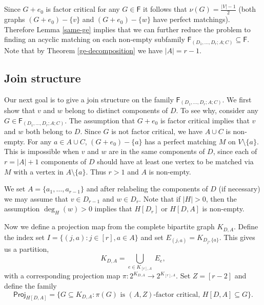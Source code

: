 \documentclass[10pt]{amsart}
\theoremstyle{definition}
\begin{document}
	Since $G+e_0$ is factor critical for any  $G\in \mathsf{F}$ it follows that $\nu(G) = \frac{|V|-1}{2}$ (both graphs $(G+e_0)-\{v\}$ and $(G+e_0)-\{w\}$ have perfect matchings).
	Therefore Lemma \ref{same-ge} implies that we can further reduce the problem to finding an acyclic matching on each non-empty subfamily $\mathsf{F}_{(D_1, \dots, D_r; A; C)} \subseteq \mathsf{F}$. Note that by Theorem \ref{ge-decomposition} we have $|A| = r-1$.
	
	
	
	
	
	\subsection*{Join structure} Our next goal is to give a join structure on the family $\mathsf{F}_{(D_1, \dots, D_r; A; C)}$. We first show that $v$ and $w$ belong to distinct components of $D$. To see why, consider any  $G\in \mathsf{F}_{(D_1, \dots, D_r; A; C)}$. The assumption that $G+e_0$ is factor critical implies that $v$ and $w$ both belong to $D$. Since $G$ is not factor critical, we have $A\cup C$ is non-empty. For any $a\in A\cup C$, $(G+e_0)-\{a\}$ has a perfect matching $M$ on $V\setminus \{a\}$. This is impossible when $v$ and $w$ are in the same components of $D$, since each of $r=|A|+1$ components of $D$ should have at least one vertex to be matched via $M$ with a vertex in $A\setminus \{a\}$. Thus $r>1$ and $A$ is non-empty.
	
	
	We set $A = \{a_1, \dots, a_{r-1}\}$ and after relabeling the components of $D$ (if necessary) we may assume that $v\in D_{r-1}$ and $w\in D_r$. Note that if $|H|>0$, then the assumption $\deg_H(w)>0$ implies that $H[D_r]$ or $H[D,A]$ is non-empty. 
	
	\medskip
	
	Now we define a projection map from the complete bipartite graph $K_{D,A}$. Define the index set 
	$I = \{(j,a) : j\in [r], a\in A\}$ and set $E_{(j,a)} = K_{D_j, \{a\}}$.
	This gives us a partition,
	\[K_{D,A} = \textstyle{\bigcup}_{e \in K_{[r],A}} \: E_e,\]
	with a corresponding projection map $\pi : 2^{K_{D,A}} \to 2^{K_{[r],A}}$. Set $Z = [r-2]$ and define the family
	\[\mathsf{Proj}_{H[D,A]} = \{G\subseteq K_{D,A} : \pi(G) \text{ is $(A,Z)$-factor critical, } H[D,A]\subseteq G\}.\]
	\medskip
	
\end{document}
